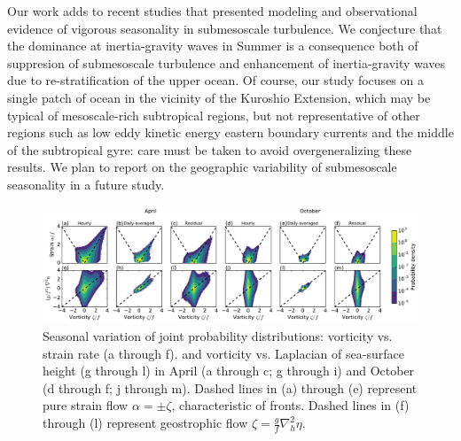 \documentclass[grl]{agutex2015}
\begin{document}
\begin{article}
Our work adds to recent studies that presented modeling \cite{sasaki_etal2014}
and observational \citep{callies_etal2015,buckingham_etal2016} evidence of vigorous seasonality in
submesoscale turbulence. We conjecture that the dominance at inertia-gravity waves in
Summer \citep{callies_etal2015} is a consequence both of suppresion of submesoscale turbulence and
enhancement of inertia-gravity waves due to re-stratification of
the upper ocean. Of course, our study focuses on a single patch of ocean in the
vicinity of the Kuroshio Extension, which may be typical of mesoscale-rich
subtropical regions, but not
representative of other regions such as low eddy kinetic energy eastern boundary currents
and the middle of the subtropical gyre: care must be taken to avoid overgeneralizing
these results.  We plan to report on the geographic variability of submesoscale
 seasonality in a future study.




\begin{figure}[ht]
  \begin{center}
    \includegraphics[width=1.\textwidth]{figs/fig3.pdf}
 \caption{Seasonal variation of joint probability distributions:  vorticity vs. strain rate (a through f).
          and vorticity vs. Laplacian of sea-surface height (g through l) in April (a through c;
          g  through i) and October (d through f;
          j  through m).
          Dashed lines in (a) through (e) represent pure strain flow $\alpha = \pm\zeta$,
          characteristic of fronts. Dashed lines in (f) through
          (l) represent geostrophic flow $\zeta = \frac{g}{f}\nabla_h^2 \eta$.}
 \label{fig3}
 \end{center}
\end{figure}



\end{article}
\end{document}
